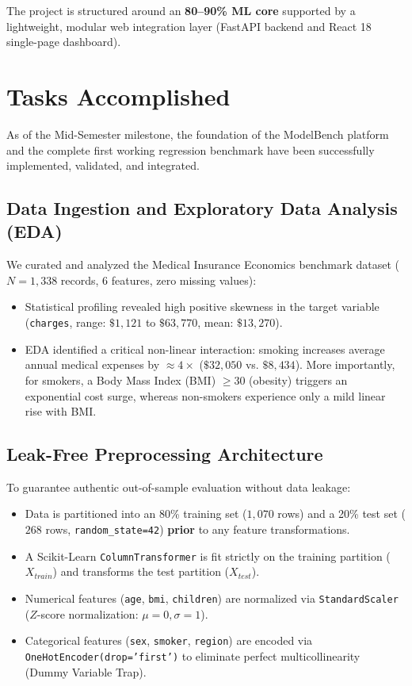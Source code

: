 \documentclass[11pt,a4paper]{article}
\begin{document}
The project is structured around an \textbf{80--90\% ML core} supported by a lightweight, modular web integration layer (FastAPI backend and React 18 single-page dashboard).

\section{Tasks Accomplished}
\label{sec:accomplished}
As of the Mid-Semester milestone, the foundation of the ModelBench platform and the complete first working regression benchmark have been successfully implemented, validated, and integrated.

\subsection{Data Ingestion and Exploratory Data Analysis (EDA)}
We curated and analyzed the Medical Insurance Economics benchmark dataset ($N = 1,338$ records, 6 features, zero missing values):
\begin{itemize}[leftmargin=*,itemsep=1pt,topsep=2pt]
    \item Statistical profiling revealed high positive skewness in the target variable (\texttt{charges}, range: $\$1,121$ to $\$63,770$, mean: $\$13,270$).
    \item EDA identified a critical non-linear interaction: smoking increases average annual medical expenses by $\approx 4\times$ ($\$32,050$ vs. $\$8,434$). More importantly, for smokers, a Body Mass Index (BMI) $\ge 30$ (obesity) triggers an exponential cost surge, whereas non-smokers experience only a mild linear rise with BMI.
\end{itemize}

\subsection{Leak-Free Preprocessing Architecture}
To guarantee authentic out-of-sample evaluation without data leakage:
\begin{itemize}[leftmargin=*,itemsep=1pt,topsep=2pt]
    \item Data is partitioned into an 80\% training set ($1,070$ rows) and a 20\% test set ($268$ rows, \texttt{random\_state=42}) \textbf{prior} to any feature transformations.
    \item A Scikit-Learn \texttt{ColumnTransformer} is fit strictly on the training partition ($X_{train}$) and transforms the test partition ($X_{test}$).
    \item Numerical features (\texttt{age}, \texttt{bmi}, \texttt{children}) are normalized via \texttt{StandardScaler} ($Z$-score normalization: $\mu=0, \sigma=1$).
    \item Categorical features (\texttt{sex}, \texttt{smoker}, \texttt{region}) are encoded via \texttt{OneHotEncoder(drop='first')} to eliminate perfect multicollinearity (Dummy Variable Trap).
\end{itemize}
\end{document}
